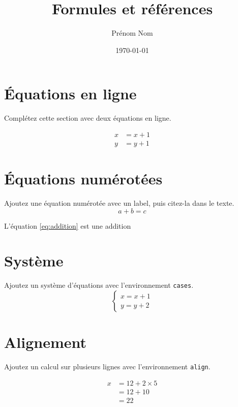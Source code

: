 \documentclass[a4paper,11pt]{article}
\title{Formules et références}
\author{Prénom Nom}
\date{\today}
\begin{document}
\maketitle

\section{Équations en ligne}

Complétez cette section avec deux équations en ligne.

\begin{align}
    x &= x + 1
    \\
    y &= y + 1
\end{align}

\section{Équations numérotées}

Ajoutez une équation numérotée avec un label, puis citez-la dans le texte.
\begin{equation}
    a + b = c 
    \label{eq:addition} %
\end{equation}

L'équation \eqref{eq:addition} est une addition

\section{Système}

Ajoutez un système d'équations avec l'environnement \texttt{cases}.
\[
\begin{cases}
    x = x+1
    \\
    y = y+2
\end{cases}
\]

\section{Alignement}

Ajoutez un calcul sur plusieurs lignes avec l'environnement \texttt{align}.

\begin{align}
    x &= 12 + 2 \times 5 
    \\
      &= 12 + 10 
    \\
      &= 22
\end{align}
\end{document}

